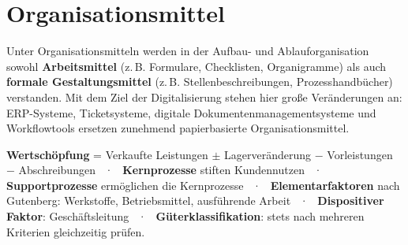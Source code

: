 \documentclass[11pt, a4paper]{article}
\begin{document}
\section{Organisationsmittel}

Unter Organisationsmitteln werden in der Aufbau- und Ablauforganisation sowohl
\textbf{Arbeitsmittel} (z.\,B. Formulare, Checklisten, Organigramme) als auch
\textbf{formale Gestaltungsmittel} (z.\,B. Stellenbeschreibungen, Prozesshandbücher)
verstanden. Mit dem Ziel der Digitalisierung stehen hier große Veränderungen an:
ERP-Systeme, Ticketsysteme, digitale Dokumentenmanagementsysteme und Workflowtools
ersetzen zunehmend papierbasierte Organisationsmittel.

\begin{merksatz}[title={\bfseries Zusammenfassung: Kernbegriffe dieser Session}]
\textbf{Wertschöpfung} = Verkaufte Leistungen $\pm$ Lagerveränderung $-$ Vorleistungen $-$ Abschreibungen ~·~
\textbf{Kernprozesse} stiften Kundennutzen ~·~
\textbf{Supportprozesse} ermöglichen die Kernprozesse ~·~
\textbf{Elementarfaktoren} nach Gutenberg: Werkstoffe, Betriebsmittel, ausführende Arbeit ~·~
\textbf{Dispositiver Faktor}: Geschäftsleitung ~·~
\textbf{Güterklassifikation}: stets nach mehreren Kriterien gleichzeitig prüfen.
\end{merksatz}
\end{document}
